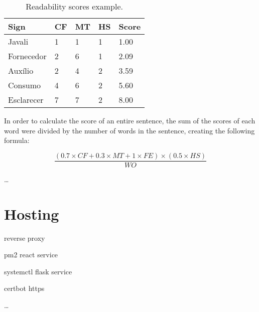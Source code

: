 \begin{table}[H]
    \centering
    \caption{Readability scores example.}
    \label{table:signs}
    \begin{tabular}{l|l|l|l|l}
        {\bfseries Sign} & {\bfseries CF} & {\bfseries MT} & {\bfseries HS} & {\bfseries Score} \\
        \hline
        Javali & 1 & 1 & 1 & 1.00  \\
        \hline
        Fornecedor & 2 & 6 & 1 & 2.09  \\
        \hline
        Auxílio & 2 & 4 & 2 & 3.59 \\
        \hline
        Consumo & 4 & 6 & 2 & 5.60 \\
        \hline
        Esclarecer & 7 & 7 & 2 & 8.00 \\
    \end{tabular}
\end{table}

In order to calculate the score of an entire sentence, the sum of the scores of each word were divided by the number of words in the sentence, creating the following formula:

\begin{equation}
    \frac{(0.7 \times CF + 0.3 \times MT + 1 \times FE) \times (0.5 \times HS)}{WO}
\label{sentecneScore}
\end{equation}

\dots %

\section{Hosting}

reverse proxy

pm2 react service

systemctl flask service

certbot https

\dots %
